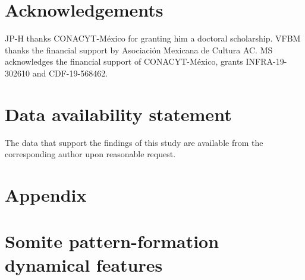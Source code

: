 \documentclass[%
 preprint,
 aip, 
 amsmath,amssymb,
]{revtex4-2}
\begin{document}
	
\section*{Acknowledgements}

JP-H thanks CONACYT-México for granting him a doctoral scholarship. VFBM thanks the financial support by Asociación Mexicana de Cultura AC. MS acknowledges the financial support of CONACYT-México, grants INFRA-19-302610 and CDF-19-568462. 

\section*{Data availability statement}


The data that support the findings of this study are available from the corresponding author upon reasonable request.
	
	
	\appendix
	
	\section*{Appendix}
	\section{Somite pattern-formation dynamical features}
	\label{app:bif}
\end{document}
